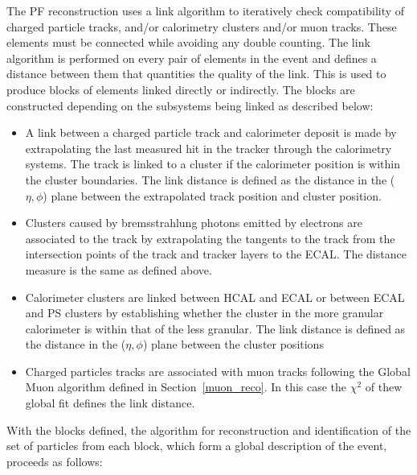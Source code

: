 The PF reconstruction uses a link algorithm to iteratively check compatibility of charged particle tracks, and/or
calorimetry clusters and/or muon tracks. These elements must be connected while avoiding any double counting. 
The link algorithm is performed on every pair of elements in the event and defines a distance between them
that quantities the quality of the link. This is used to produce blocks of elements linked directly 
or indirectly. The blocks are constructed depending on the subsystems being linked as described below:

\begin{itemize}
\item A link between a charged particle track and calorimeter deposit is made by extrapolating the last measured
hit in the tracker through the calorimetry systems. The track is linked to a cluster if the calorimeter position
is within the cluster boundaries. The link distance is defined as the distance in the ($\eta,\phi$) plane between
the extrapolated track position and cluster position.
\item Clusters caused by bremsstrahlung photons emitted by electrons are associated to the track by extrapolating
the tangents to the track from the intersection points of the track and tracker layers to the ECAL. The distance measure
is the same as defined above.
\item Calorimeter clusters are linked between HCAL and ECAL or between ECAL and PS clusters by establishing whether
the cluster in the more granular calorimeter is within that of the less granular. The link distance is defined
as the distance in the ($\eta,\phi$) plane between the cluster positions
\item Charged particles tracks are associated with muon tracks following the Global Muon algorithm defined in 
Section~\ref{muon_reco}. In this case the $\chi^2$ of thew global fit defines the link distance.
\end{itemize}

With the blocks defined, the algorithm for reconstruction and identification of the set of particles from each
block, which form a global description of the event, proceeds as follows:

